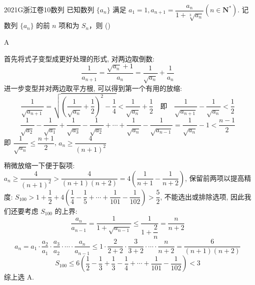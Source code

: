 
\begin{problem}{2021}{G}{浙江卷}{10}{数列}
已知数列 $\{a_n\}$ 满足 $a_1=1, a_{n+1}=\dfrac{a_n}{1+\sqrt[3]{a_n}}(n\in \mathbf{N}^*)$. 记数列 $\{a_n\}$ 的前 $n$ 项和为 $S_n$，则
(\hspace{1cm})
\begin{choices}
\end{choices}
\end{problem}

\begin{answer}
A
\end{answer}

\begin{solutions}
首先将式子变型成更好处理的形式, 对两边取倒数:
$$
\dfrac{1}{a_{n+1}}=\dfrac{\sqrt{a_n}+1}{a_n}=\dfrac{1}{\sqrt{a_n}}+\dfrac{1}{a_n}
$$
进一步变型并对两边取平方根, 可以得到第一个有用的放缩:
$$
\dfrac{1}{\sqrt{a_{n+1}}}=\sqrt{\left(\dfrac{1}{\sqrt{a_n}}+\dfrac{1}{2}\right)^2-\dfrac{1}{4}}<\dfrac{1}{\sqrt{a_n}}+\dfrac{1}{2} \quad \text{即} \quad \dfrac{1}{\sqrt{a_{n+1}}}-\dfrac{1}{\sqrt{a_n}}<\dfrac{1}{2}
$$
$$
\dfrac{1}{\sqrt{a_2}}-\dfrac{1}{\sqrt{a_1}}+\dfrac{1}{\sqrt{a_3}}-\dfrac{1}{\sqrt{a_2}}+\cdots+\dfrac{1}{\sqrt{a_n}}-\dfrac{1}{\sqrt{a_{n-1}}}=\dfrac{1}{\sqrt{a_n}}-1<\dfrac{n-1}{2}
$$
即 $\dfrac{1}{\sqrt{a_n}}\leqslant\dfrac{n+1}{2}$, $a_n\geqslant\dfrac{4}{(n+1)^2}$

稍微放缩一下便于裂项: $a_n\geqslant\dfrac{4}{(n+1)^2}>\dfrac{4}{(n+1)(n+2)}=4\left(\dfrac{1}{n+1}-\dfrac{1}{n+2}\right)$, 保留前两项以提高精度: $S_{100}>1+\dfrac{1}{2}+4\left(\dfrac{1}{4}-\dfrac{1}{5}+\cdots+\dfrac{1}{101}-\dfrac{1}{102}\right)>\dfrac{5}{2}$, 不能选出或排除选项, 因此我们还要考虑 $S_{100}$ 的上界:
$$
\dfrac{a_n}{a_{n-1}}=\dfrac{1}{1+\sqrt{a_{n-1}}}\leqslant\dfrac{1}{1+\dfrac{2}{n}}=\dfrac{n}{n+2}
$$
$$
a_n=a_1\cdot\dfrac{a_2}{a_1}\cdot\dfrac{a_3}{a_2}\cdot\cdots\cdot\dfrac{a_n}{a_{n-1}}\leqslant1\cdot\dfrac{2}{2+2}\cdot\dfrac{3}{3+2}\cdot\cdots\cdot\dfrac{n}{n+2}=\dfrac{6}{(n+1)(n+2)}
$$
$$
S_{100}\leqslant6\left(\dfrac{1}{2}-\dfrac{1}{3}+\dfrac{1}{3}-\dfrac{1}{4}+\cdots+\dfrac{1}{101}-\dfrac{1}{102}\right)<3
$$
综上选 A.
\end{solutions}